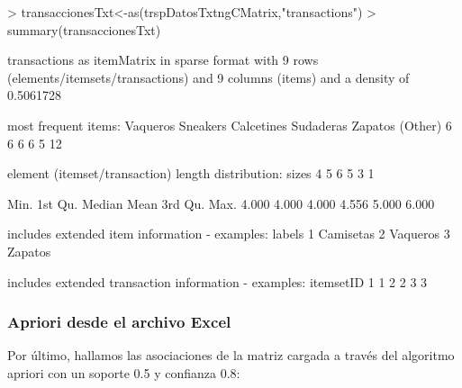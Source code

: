 \documentclass [a4paper] {article}
\begin{document}
\begin{Schunk}
\begin{Sinput}
> transaccionesTxt<-as(trspDatosTxtngCMatrix,"transactions")
> summary(transaccionesTxt)
\end{Sinput}
\begin{Soutput}
transactions as itemMatrix in sparse format with
 9 rows (elements/itemsets/transactions) and
 9 columns (items) and a density of 0.5061728 

most frequent items:
  Vaqueros   Sneakers Calcetines  Sudaderas    Zapatos    (Other) 
         6          6          6          6          5         12 

element (itemset/transaction) length distribution:
sizes
4 5 6 
5 3 1 

   Min. 1st Qu.  Median    Mean 3rd Qu.    Max. 
  4.000   4.000   4.000   4.556   5.000   6.000 

includes extended item information - examples:
     labels
1 Camisetas
2  Vaqueros
3   Zapatos

includes extended transaction information - examples:
  itemsetID
1         1
2         2
3         3
\end{Soutput}
\end{Schunk}

\subsubsection{Apriori desde el archivo Excel}
Por último, hallamos las asociaciones de la matriz cargada a través del algoritmo
apriori con un soporte 0.5 y confianza 0.8:
\end{document}
